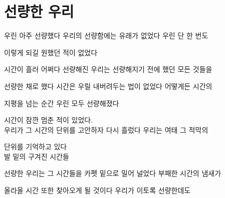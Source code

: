 \hypertarget{uxc120uxb7c9uxd55c-uxc6b0uxb9ac}{%

\section{선량한 우리}\label{uxc120uxb7c9uxd55c-uxc6b0uxb9ac}}



우린 아주 선량했다 우리의 선량함에는 유래가 없었다 우린 단 한 번도

이렇게 되길 원했던 적이 없었다



시간이 흘러 어쩌다 선량해진 우리는 선량해지기 전에 했던 모든 것들을

선량한 채로 했다 시간은 우릴 내버려두는 법이 없었다 어떻게든 시간의

지평을 넘는 순간 우린 모두 선량해졌다



시간이 잠깐 멈춘 적이 있었다.\\

우리가 그 시간의 단위를 고안하자 다시 흘렀다 우리는 여태 그 적막의

단위를 기억하고 있다\\

발 밑의 구겨진 시간들



선량한 우리는 그 시간들을 카펫 밑으로 밀어 널었다 부패한 시간의 냄새가

올라올 시간 또한 찾아오게 될 것이다 우리가 이토록 선량한데도

